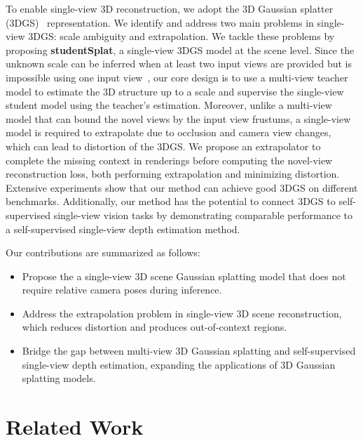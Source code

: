 \documentclass{article} %
\begin{document}
To enable single-view 3D reconstruction, we adopt the 3D Gaussian splatter (3DGS)~\citep{kerbl20233d} representation. We identify and address two main problems in single-view 3DGS: scale ambiguity and extrapolation. We tackle these problems by proposing \textbf{studentSplat}, a single-view 3DGS model at the scene level. Since the unknown scale can be inferred when at least two input views are provided but is impossible using one input view~\citep{charatan2024pixelsplat,chen2024mvsplat}, our core design is to use a multi-view teacher model to estimate the 3D structure up to a scale and supervise the single-view student model using the teacher's estimation. Moreover, unlike a multi-view model that can bound the novel views by the input view frustums, a single-view model is required to extrapolate due to occlusion and camera view changes, which can lead to distortion of the 3DGS. We propose an extrapolator to complete the missing context in renderings before computing the novel-view reconstruction loss, both performing extrapolation and minimizing distortion. Extensive experiments show that our method can achieve good 3DGS on different benchmarks. Additionally, our method has the potential to connect 3DGS to self-supervised single-view vision tasks by demonstrating comparable performance to a self-supervised single-view depth estimation method.

Our contributions are summarized as follows: \begin{itemize} 
\item Propose the a single-view 3D scene Gaussian splatting model that does not require relative camera poses during inference. 
\item Address the extrapolation problem in single-view 3D scene reconstruction, which reduces distortion and produces out-of-context regions. 
\item Bridge the gap between multi-view 3D Gaussian splatting and self-supervised single-view depth estimation, expanding the applications of 3D Gaussian splatting models. 
\end{itemize}

\section{Related Work}
\end{document}
